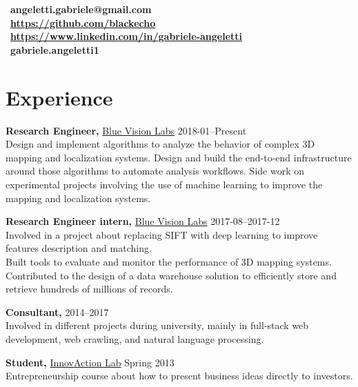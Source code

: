 \documentclass[margin]{res}
\begin{document}
    \address{London, UK  \\ (+44) 7803 056685}
    \begin{resume}
        \section{}
        \faEnvelope~\textbf{angeletti.gabriele@gmail.com} \\[5pt]
        \faGithub~\textbf{\url{https://github.com/blackecho}} \\[5pt]
        \faLinkedin~\textbf{\url{https://www.linkedin.com/in/gabriele-angeletti}} \\[5pt]
        \faSkype~\textbf{gabriele.angeletti1}

        \section{Experience}
            {\bf Research Engineer,} \href{http://www.bluevisionlabs.com}{Blue Vision Labs} \hfill 2018-01--Present\\
            Design and implement algorithms to analyze the behavior of complex 3D mapping and localization systems.
            Design and build the end-to-end infrastructure around those algorithms to automate analysis workflows.
            Side work on experimental projects involving the use of machine learning to improve the mapping and localization systems.

            {\bf Research Engineer intern,} \href{http://www.bluevisionlabs.com}{Blue Vision Labs} \hfill 2017-08--2017-12\\
            Involved in a project about replacing SIFT with deep learning to improve features description and matching.\\
	        Built tools to evaluate and monitor the performance of 3D mapping systems.\\
	        Contributed to the design of a data warehouse solution to efficiently store and retrieve hundreds of millions of records.

            {\bf Consultant,} \hfill 2014--2017\\
            Involved in different projects during university, mainly in full-stack web development,
            web crawling, and natural language processing.

            {\bf Student,} \href{http://www.innovactionlab.org/?lang=en}{InnovAction Lab} \hfill Spring 2013\\
            Entrepreneurship course about how to present business ideas directly to investors.


\end{resume}
\end{document}
